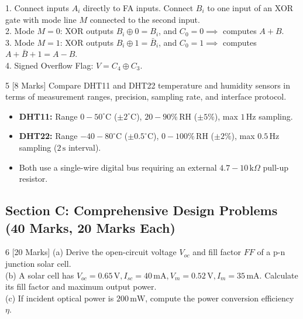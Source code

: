\begin{solbox}
1. Connect inputs $A_i$ directly to FA inputs. Connect $B_i$ to one input of an XOR gate with mode line $M$ connected to the second input.\\
2. Mode $M=0$: XOR outputs $B_i \oplus 0 = B_i$, and $C_0 = 0 \implies$ computes $A + B$.\\
3. Mode $M=1$: XOR outputs $B_i \oplus 1 = \bar{B}_i$, and $C_0 = 1 \implies$ computes $A + \bar{B} + 1 = A - B$.\\
4. Signed Overflow Flag: $V = C_4 \oplus C_3$.
\end{solbox}

\begin{examqbox}{5 [8 Marks]}
Compare DHT11 and DHT22 temperature and humidity sensors in terms of measurement ranges, precision, sampling rate, and interface protocol.
\end{examqbox}

\begin{solbox}
\begin{itemize}
    \item \textbf{DHT11:} Range $0-50^\circ\text{C}$ ($\pm 2^\circ\text{C}$), $20-90\%\,\text{RH}$ ($\pm 5\%$), max $1\,\text{Hz}$ sampling.
    \item \textbf{DHT22:} Range $-40-80^\circ\text{C}$ ($\pm 0.5^\circ\text{C}$), $0-100\%\,\text{RH}$ ($\pm 2\%$), max $0.5\,\text{Hz}$ sampling ($2\,\text{s}$ interval).
    \item Both use a single-wire digital bus requiring an external $4.7-10\,\text{k}\Omega$ pull-up resistor.
\end{itemize}
\end{solbox}

\subsection*{Section C: Comprehensive Design Problems (40 Marks, 20 Marks Each)}

\begin{examqbox}{6 [20 Marks]}
(a) Derive the open-circuit voltage $V_{oc}$ and fill factor $FF$ of a p-n junction solar cell.\\
(b) A solar cell has $V_{oc} = 0.65\,\text{V}, I_{sc} = 40\,\text{mA}, V_m = 0.52\,\text{V}, I_m = 35\,\text{mA}$. Calculate its fill factor and maximum output power.\\
(c) If incident optical power is $200\,\text{mW}$, compute the power conversion efficiency $\eta$.
\end{examqbox}

